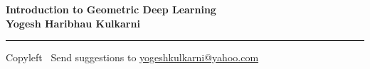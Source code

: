 
\graphicspath{{images/}}

\footnotesize


\begin{center}
\Large{\textbf{Introduction to Geometric Deep Learning\\ Yogesh Haribhau Kulkarni}}  
\end{center}

\begin{multicols}{2}

\end{multicols}

\rule{\linewidth}{0.25pt}
\scriptsize
Copyleft \textcopyleft\  Send suggestions to 
\href{http://www.yogeshkulkarni.com}{yogeshkulkarni@yahoo.com}


